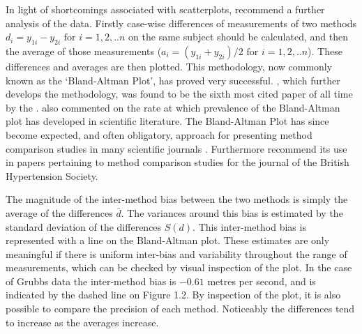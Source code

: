 \documentclass[12pt, a4paper]{report}
\begin{document}
	In light of shortcomings associated with scatterplots,
	\citet*{BA83} recommend a further analysis of the data. Firstly
	case-wise differences of measurements of two methods $d_{i} =
	y_{1i}-y_{2i} \mbox{ for }i=1,2,..n$ on the same subject should be
	calculated, and then the average of those measurements ($a_{i} =
	(y_{1i} + y_{2i})/2 \mbox{ for }i=1,2,..n$). These differences and
	averages are then plotted. This methodology, now commonly known as
	the `Bland-Altman Plot', has proved very successful.
	\citet*{BA86}, which further develops the methodology, was found
	to be the sixth most cited paper of all time by the
	\citet{BAcite}. \cite{Dewitte} also commented on the rate at which
	prevalence of the Bland-Altman plot has developed in scientific
	literature. The Bland-Altman Plot has since become expected, and
	often obligatory, approach for presenting method comparison
	studies in many scientific journals \citep{hollis}. Furthermore
	\citet{BritHypSoc} recommend its use in papers pertaining to
	method comparison studies for the journal of the British
	Hypertension Society.
	
	The magnitude of the inter-method bias between the two methods is
	simply the average of the differences $\bar{d}$. The variances
	around this bias is estimated by the standard deviation of the
	differences $S(d)$. This inter-method bias is represented with a
	line on the Bland-Altman plot. These estimates are only meaningful
	if there is uniform inter-bias and variability throughout the
	range of measurements, which can be checked by visual inspection
	of the plot. In the case of Grubbs data the inter-method bias is
	$-0.61$ metres per second, and is indicated by the dashed line on
	Figure 1.2. By inspection of the plot, it is also possible to
	compare the precision of each method. Noticeably the differences
	tend to increase as the averages increase.
	
\end{document}
